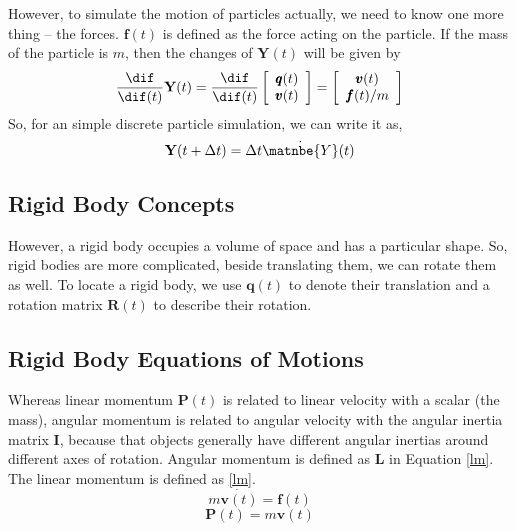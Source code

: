 However, to simulate the motion of particles actually, we need to know one more thing -- the forces. $\pmb{f}(t)$ is defined as the force acting on the particle. If the mass of the particle is $m$, then the changes of $\textbf{Y}(t)$ will be given by
\begin{equation}
    \frac{\dif}{\dif(t)}\textbf{Y}(t) = \frac{\dif}{\dif(t)}\left[
        \begin{array}{c}
            \pmb{q}(t) \\
            \pmb{v}(t) \\
        \end{array} \right] = \left[
        \begin{array}{c}
            \pmb{v}(t) \\
            \pmb{f}(t)/m \\
        \end{array} \right]
\end{equation}
So, for an simple discrete particle simulation, we can write it as,
$$\mathbf{Y}(t+\Delta t) = \Delta t \dot{\matnbe{Y}}(t)$$

\subsection{Rigid Body Concepts}
However, a rigid body occupies a volume of space and has a particular shape. So, rigid bodies are more complicated, beside translating them, we can rotate them as well. To locate a rigid body, we use $\pmb{q}(t)$ to denote their translation and a rotation matrix $\pmb{R}(t)$ to describe their rotation.

\subsection{Rigid Body Equations of Motions}
\label{sec:rigid_rm}
 Whereas linear momentum $\pmb{P}(t)$ is related to linear velocity with a scalar (the mass), angular momentum is related to angular velocity with the angular inertia matrix \(\pmb{I}\), because that objects generally have different angular inertias around different axes of rotation. Angular momentum is defined as \(\pmb{L}\) in Equation \ref{lm}. The linear momentum is defined as \ref{lm}.
\begin{equation}
    m \dot{\pmb{v}(t)} = \pmb{f}(t)
    \label{force}
\end{equation}
\begin{equation}
    \pmb{P}(t) = m \pmb{v} (t)
    \label{lm}
\end{equation}

